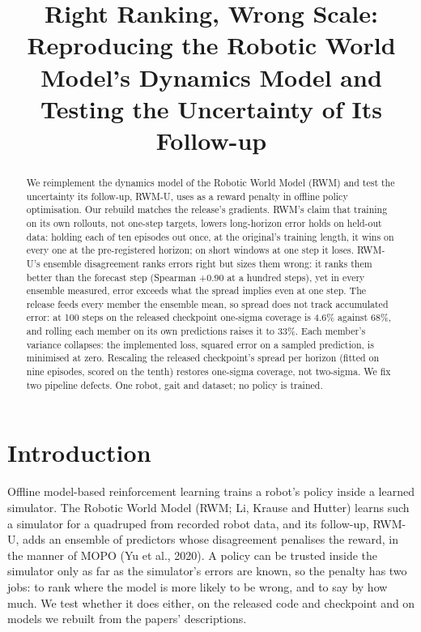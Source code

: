 \documentclass[10pt]{article}
\title{Right Ranking, Wrong Scale: Reproducing the Robotic World Model's Dynamics Model and Testing the Uncertainty of Its Follow-up}
\author{}
\date{}
\begin{document}
\maketitle


\begin{abstract}
We reimplement the dynamics model of the Robotic World Model (RWM) and test the uncertainty its follow-up, RWM-U, uses as a reward penalty in offline policy optimisation. Our rebuild matches the release's gradients. RWM's claim that training on its own rollouts, not one-step targets, lowers long-horizon error holds on held-out data: holding each of ten episodes out once, at the original's training length, it wins on every one at the pre-registered horizon; on short windows at one step it loses. RWM-U's ensemble disagreement ranks errors right but sizes them wrong: it ranks them better than the forecast step (Spearman +0.90 at a hundred steps), yet in every ensemble measured, error exceeds what the spread implies even at one step. The release feeds every member the ensemble mean, so spread does not track accumulated error: at 100 steps on the released checkpoint one-sigma coverage is 4.6\% against 68\%, and rolling each member on its own predictions raises it to 33\%. Each member's variance collapses: the implemented loss, squared error on a sampled prediction, is minimised at zero. Rescaling the released checkpoint's spread per horizon (fitted on nine episodes, scored on the tenth) restores one-sigma coverage, not two-sigma. We fix two pipeline defects. One robot, gait and dataset; no policy is trained.
\end{abstract}

\section{Introduction}

Offline model-based reinforcement learning trains a robot's policy inside a learned simulator. The Robotic World Model (RWM; Li, Krause and Hutter) learns such a simulator for a quadruped from recorded robot data, and its follow-up, RWM-U, adds an ensemble of predictors whose disagreement penalises the reward, in the manner of MOPO (Yu et al., 2020). A policy can be trusted inside the simulator only as far as the simulator's errors are known, so the penalty has two jobs: to rank where the model is more likely to be wrong, and to say by how much. We test whether it does either, on the released code and checkpoint and on models we rebuilt from the papers' descriptions.
\end{document}
